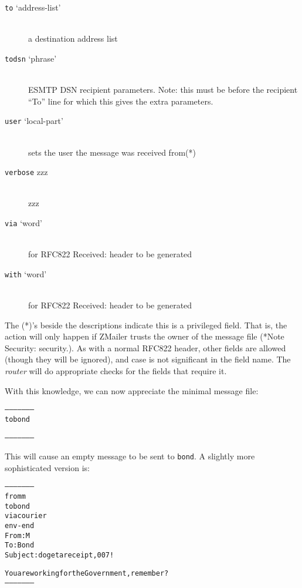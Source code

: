 \begin{description}
\item[{\tt to} `address-list'] \mbox{} \\
a destination address list

\item[{\tt todsn} `phrase'] \mbox{} \\
ESMTP DSN recipient parameters.
Note: this must be before the recipient ``To'' line for which
this gives the extra parameters.

\item[{\tt user} `local-part'] \mbox{} \\
sets the user the message was received from(*)

\item[{\tt verbose} zzz] \mbox{} \\
zzz

\item[{\tt via} `word'] \mbox{} \\
for RFC822 Received: header to be generated

\item[{\tt with} `word'] \mbox{} \\
for RFC822 Received: header to be generated

\end{description}


The (*)'s beside the descriptions indicate this is a privileged field.
That is, the action will only happen if ZMailer trusts the owner of the
message file (*Note Security: security.).  As with a normal RFC822 header,
other fields are allowed (though they will be ignored), and case is not
significant in the field name.  The {\em router} will do appropriate checks for
the fields that require it.

With this knowledge, we can now appreciate the minimal message file:

\begin{alltt}
     --------------------
     to bond
     
     --------------------
\end{alltt}


This will cause an empty message to be sent to {\tt bond}.  A slightly more
sophisticated version is:

\begin{alltt}
     --------------------
     from m
     to bond
     via courier
     env-end
     From: M
     To: Bond
     Subject: do get a receipt, 007!
     
     You are working for the Government, remember?
     --------------------
\end{alltt}


